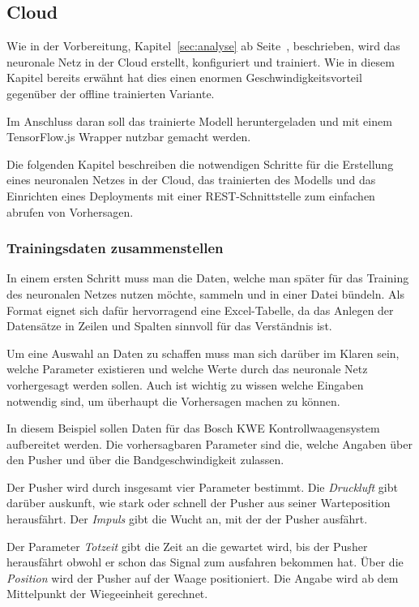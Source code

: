 \subsection{Cloud}
Wie in der Vorbereitung, Kapitel~\ref{sec:analyse} ab Seite~\pageref{sec:analyse}, beschrieben, wird das neuronale Netz
in der Cloud erstellt, konfiguriert und trainiert. Wie in diesem Kapitel bereits erwähnt hat dies einen enormen
Geschwindigkeitsvorteil gegenüber der offline trainierten Variante.

Im Anschluss daran soll das trainierte Modell heruntergeladen und mit einem TensorFlow.js Wrapper nutzbar gemacht
werden.

Die folgenden Kapitel beschreiben die notwendigen Schritte für die Erstellung eines neuronalen Netzes in der Cloud, das
trainierten des Modells und das Einrichten eines Deployments mit einer REST-Schnittstelle zum einfachen abrufen von
Vorhersagen.

\subsubsection{Trainingsdaten zusammenstellen}
In einem ersten Schritt muss man die Daten, welche man später für das Training des neuronalen Netzes nutzen möchte,
sammeln und in einer Datei bündeln. Als Format eignet sich dafür hervorragend eine Excel-Tabelle, da das Anlegen der
Datensätze in Zeilen und Spalten sinnvoll für das Verständnis ist.

Um eine Auswahl an Daten zu schaffen muss man sich darüber im Klaren sein, welche Parameter existieren und welche Werte
durch das neuronale Netz vorhergesagt werden sollen. Auch ist wichtig zu wissen welche Eingaben notwendig sind, um
überhaupt die Vorhersagen machen zu können.

In diesem Beispiel sollen Daten für das Bosch KWE Kontrollwaagensystem aufbereitet werden. Die vorhersagbaren Parameter
sind die, welche Angaben über den Pusher und über die Bandgeschwindigkeit zulassen.

Der Pusher wird durch insgesamt vier Parameter bestimmt. Die \textit{Druckluft} gibt darüber auskunft, wie stark oder
schnell der Pusher aus seiner Warteposition herausfährt. Der \textit{Impuls} gibt die Wucht an, mit der der Pusher
ausfährt.

Der Parameter \textit{Totzeit} gibt die Zeit an die gewartet wird, bis der Pusher herausfährt obwohl er schon das Signal
zum ausfahren bekommen hat. Über die \textit{Position} wird der Pusher auf der Waage positioniert. Die Angabe wird ab
dem Mittelpunkt der Wiegeeinheit gerechnet.

